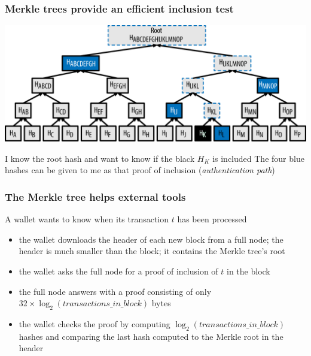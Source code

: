 \documentclass[11pt]{beamer}  %
\begin{document}
\begin{frame}\frametitle{Merkle trees provide an efficient inclusion test}

  \begin{center}
    \includegraphics[width=\textwidth,clip=false]{pictures/mbc2_0905.png}
  \end{center}

  \begin{greenbox}{I know the root hash and want to know if the {\color{black}black $H_K$} is included}
    The {\color{blue}four blue hashes} can be given to me as that proof of inclusion
    (\emph{authentication path})
  \end{greenbox}

\end{frame}

\begin{frame}\frametitle{The Merkle tree helps external tools}

  \begin{greenbox}{A wallet wants to know when its transaction $t$ has been processed}
    \begin{itemize}
    \item the wallet downloads the header of each new block from a full node;
      the header is much smaller than the block; it contains the Merkle tree's root
    \item the wallet asks the full node for a proof of inclusion of $t$ in the block
    \item the full node answers with a proof consisting of only
      $32\times\log_2(\mathit{transactions\_in\_block})$ bytes
    \item the wallet checks the proof by computing
      $\log_2(\mathit{transactions\_in\_block})$ hashes and comparing the last
      hash computed to the Merkle root in the header
    \end{itemize}
  \end{greenbox}

\end{frame}
\end{document}

